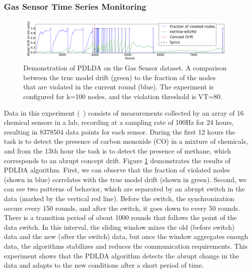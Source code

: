 \subsubsection{Gas Sensor Time Series Monitoring}
\begin{figure}[ht!]
\centering
\includegraphics[width=\textwidth]{BigGas/overTime100k.png}
\caption{Demonstration of PDLDA on the Gas Sensor dataset.
A comparison between the true model drift (green) to the fraction of the nodes that
are violated in the current round (blue).
The experiment is configured for k=100 nodes, and the violation threshold is
VT=80.}
\label{BigGasOverTime}
\end{figure}
Data in this experiment (~\citealt{bigGas}) consists of measurements collected
by an array of 16 chemical sensors in a lab, recording at a sampling
rate of 100Hz for 24 hours, resulting in 8378504 data points for each sensor.
During the first 12 hours the task is to detect the presence of carbon monoxide
(CO) in a mixture of chemicals, and from the 13th hour the task is to detect the presence of methane, which corresponds to an abrupt concept drift.
Figure \ref{BigGasOverTime} demonstrates the results of PDLDA algorithm.
First, we can observe that the fraction of violated nodes (shown in blue) correlates with the true model drift (shown in green). Second, we can see two patterns of behavior, which are separated by an abrupt switch in the data  (marked by the vertical red line). Before the switch,  the synchronization occurs every 150 rounds, and after the switch, it goes down to every 50 rounds. There is a transition period of about 1000 rounds that follows the point of the data switch. In this interval, the sliding window mixes the old (before switch) data and the new (after the switch) data, but once the window aggregates enough data, the algorithms stabilizes and reduces the communication requirements.   This experiment shows that the PDLDA algorithm detects the abrupt change in the data and adapts to the new conditions after a short period of time.
